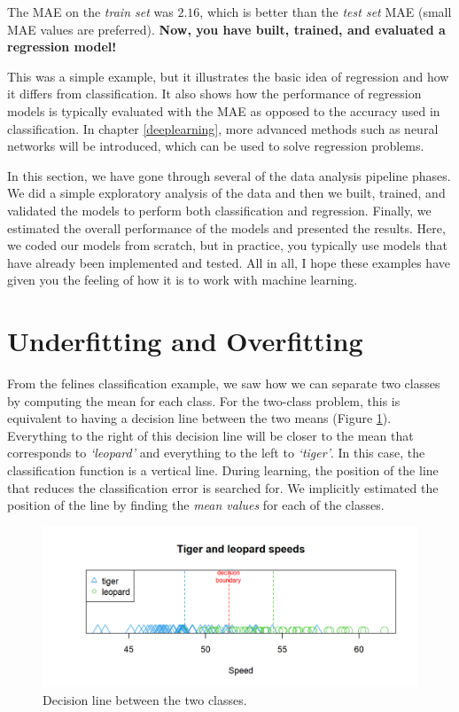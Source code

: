 \documentclass[
  11pt,
]{krantz}
\begin{document}
The MAE on the \emph{train set} was \(2.16\), which is better than the \emph{test set} MAE (small MAE values are preferred). \textbf{Now, you have built, trained, and evaluated a regression model!}

This was a simple example, but it illustrates the basic idea of regression and how it differs from classification. It also shows how the performance of regression models is typically evaluated with the MAE as opposed to the accuracy used in classification. In chapter \ref{deeplearning}, more advanced methods such as neural networks will be introduced, which can be used to solve regression problems.

In this section, we have gone through several of the data analysis pipeline phases. We did a simple exploratory analysis of the data and then we built, trained, and validated the models to perform both classification and regression. Finally, we estimated the overall performance of the models and presented the results. Here, we coded our models from scratch, but in practice, you typically use models that have already been implemented and tested. All in all, I hope these examples have given you the feeling of how it is to work with machine learning.

\hypertarget{underfitting-and-overfitting}{%
\section{Underfitting and Overfitting}\label{underfitting-and-overfitting}}

From the felines classification example, we saw how we can separate two classes by computing the mean for each class. For the two-class problem, this is equivalent to having a decision line between the two means (Figure \ref{fig:boundary}). Everything to the right of this decision line will be closer to the mean that corresponds to \emph{`leopard'} and everything to the left to \emph{`tiger'}. In this case, the classification function is a vertical line. During learning, the position of the line that reduces the classification error is searched for. We implicitly estimated the position of the line by finding the \emph{mean values} for each of the classes.

\begin{figure}

{\centering \includegraphics[width=1\linewidth]{images/boundary} 

}

\caption{Decision line between the two classes.}\label{fig:boundary}
\end{figure}
\end{document}
